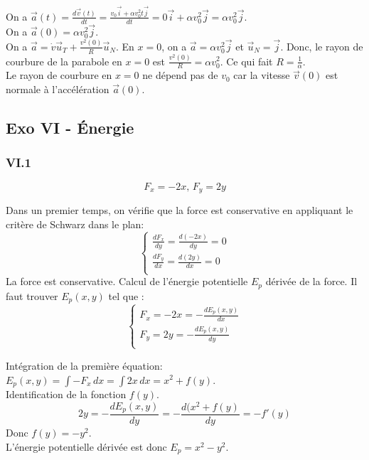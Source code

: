 \documentclass[]{book}
\theoremstyle{definition}
\begin{document}
On a $\vec{a}(t) = \frac{d\vec{v}(t)}{dt} = \frac{v_0\vec{i}+\alpha v_0^2 t \vec{j}}{dt} = 0\vec{i}+\alpha v_0^2\vec{j} = \alpha v_0^2\vec{j}$. \\

On a $\vec{a}(0) = \alpha v_0^2 \vec{j}$.\\

On a $\vec{a} = \dot{v}\vec{u}_T + \frac{v^2(0)}{R}\vec{u}_N$. En $x=0$, on a $\vec{a} = \alpha v_0^2 \vec{j}$ et $\vec{u}_N = \vec{j}$. Donc, le rayon de courbure de la parabole en $x = 0$ est $\frac{v^2(0)}{R} = \alpha v_0^2$. Ce qui fait $R=\frac{1}{\alpha}$. \\

Le rayon de courbure en $x=0$ ne d\'epend pas de $v_0$ car la vitesse $\vec{v}(0)$ est normale \`a l'acc\'el\'eration $\vec{a}(0)$.

\subsection*{Exo VI - \'Energie}
\subsubsection*{VI.1}
$$F_x = -2x,\, F_y = 2y$$

Dans un premier temps, on v\'erifie que la force est conservative en appliquant le crit\`ere de Schwarz dans le plan:
$$
\left\{
\begin{array}{l }
	\frac{dF_x}{dy} = \frac{d(-2x)}{dy} = 0\\
	\frac{dF_y}{dx} = \frac{d(2y)}{dx} = 0\\
\end{array}
\right. 
$$
La force est conservative. Calcul de l'\'energie potentielle $E_p$ d\'eriv\'ee de la force. Il faut trouver $E_p(x,y)$ tel que :
$$
\left\{
\begin{array}{l }
	F_x = -2x = -\frac{dE_p(x,y)}{dx} \\
	F_y =  2y = -\frac{dE_p(x,y)}{dy} \\
\end{array}
\right. 
$$

Int\'egration de la premi\`ere \'equation: $E_p(x,y) = \int{-F_x\, dx} = \int{2x\, dx} = x^2 + f(y)$.\\
Identification de la fonction $f(y)$. 
$$2y = -\frac{dE_p(x,y)}{dy} = -\frac{d(x^2+f(y)}{dy} = -f'(y)$$
Donc $f(y) = -y^2$.\\

L'\'energie potentielle d\'eriv\'ee est donc $E_p = x^2 - y^2$.
\end{document}
